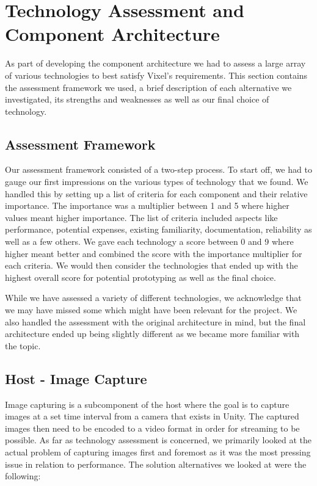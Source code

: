 \section{Technology Assessment and Component Architecture}
As part of developing the component architecture we had to assess a large array of various technologies to best satisfy Vixel's requirements. This section contains the assessment framework we used, a brief description of each alternative we investigated, its strengths and weaknesses as well as our final choice of technology.

\subsection{Assessment Framework}
Our assessment framework consisted of a two-step process. To start off, we had to gauge our first impressions on the various types of technology that we found.
We handled this by setting up a list of criteria for each component and their relative importance. The importance was a multiplier between 1 and 5 where higher values meant higher importance. The list of criteria included aspects like performance, potential expenses, existing familiarity, documentation, reliability as well as a few others. We gave each technology a score between 0 and 9 where higher meant better and combined the score with the importance multiplier for each criteria. We would then consider the technologies that ended up with the highest overall score for potential prototyping as well as the final choice. 

While we have assessed a variety of different technologies, we acknowledge that we may have missed some which might have been relevant for the project. We also handled the assessment with the original architecture in mind, but the final architecture ended up being slightly different as we became more familiar with the topic. 

\subsection{Host - Image Capture} %
Image capturing is a subcomponent of the host where the goal is to capture images at a set time interval from a camera that exists in Unity. The captured images then need to be encoded to a video format in order for streaming to be possible. As far as technology assessment is concerned, we primarily looked at the actual problem of capturing images first and foremost as it was the most pressing issue in relation to performance. The solution alternatives we looked at were the following:

